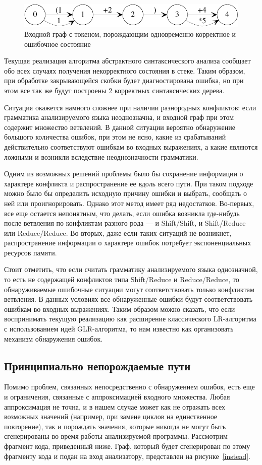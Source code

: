 \begin{figure}[h]
 \label{both}
 \centering
 \includegraphics[width=0.75\linewidth]{Verbitskaia/BothStates.pdf}
 \caption{Входной граф с токеном, порождающим одновременно корректное и ошибочное состояние}
 \label{both}
\end{figure}

Текущая реализация алгоритма абстрактного синтаксического анализа сообщает обо 
всех случаях получения некорректного состояния в стеке. Таким образом, при обработке 
закрывающейся скобки будет диагностирована ошибка, но при этом все так же будут 
построены 2 корректных синтаксических дерева. 

Ситуация окажется намного сложнее при наличии разнородных конфликтов: если грамматика 
анализируемого языка неоднозначна, и входной граф при этом содержит множество 
ветвлений. В данной ситуации вероятно обнаружение большого количества ошибок, при 
этом не ясно, какие из срабатываний действительно соответствуют ошибкам во входных 
выражениях, а какие являются ложными и возникли вследствие неоднозначности грамматики. 

Одним из возможных решений проблемы было бы сохранение информации о характере 
конфликта и распространение ее вдоль всего пути. При таком подходе можно было бы 
определить исходную причину ошибки и выбрать, сообщать о ней или проигнорировать. 
Однако этот метод имеет ряд недостатков. Во-первых, все еще остается непонятным, 
что делать, если ошибка возникла где-нибудь после ветвления по конфликтам разного 
рода — и Shift/Shift, и Shift/Reduce или Reduce/Reduce. Во-вторых, даже если таких 
ситуаций не возникнет, распространение информации о характере ошибок потребует 
экспоненциальных ресурсов памяти. 

Стоит отметить, что если считать грамматику анализируемого языка однозначной, то 
есть не содержащей конфликтов типа Shift/Reduce и Reduce/Reduce, то обнаруживаемые 
ошибочные ситуации могут соответствовать только конфликтам ветвления. В данных 
условиях все обнаруженные ошибки будут соответствовать ошибкам во входных выражениях. 
Таким образом можно сказать, что если воспринимать текущую реализацию как расширение 
классического LR-алгоритма с использованием идей GLR-алгоритма, то нам известно 
как организовать механизм обнаружения ошибок. 

\subsection{Принципиально непорождаемые пути}
Помимо проблем, связанных непосредственно с обнаружением ошибок, есть еще и 
ограничения, связанные с аппроксимацией входного множества. Любая аппроксимация 
не точна, и в нашем случае может как не отражать всех возможных значений (например, 
при замене циклов на единственное повторение), так и порождать значения, которые 
никогда не могут быть сгенерированы во время работы анализируемой программы. 
Рассмотрим фрагмент кода, приведенный ниже. Граф, который будет сгенерирован по 
этому фрагменту кода и подан на вход анализатору, представлен на рисунке~\ref{instead}.

